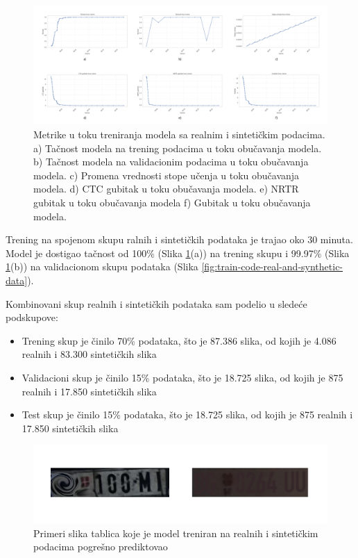 \documentclass[a4paper,12pt]{article}
\begin{document}
	\begin{figure}[H]
		\centering
		\includegraphics[width=\textwidth]{assets/real-and-synthetic-data-metrics.png}
		\caption{Metrike u toku treniranja modela sa realnim i sintetičkim podacima. a) Tačnost modela na trening podacima u toku obučavanja modela. b) Tačnost modela na validacionim podacima u toku obučavanja modela. c) Promena vrednosti stope učenja u toku obučavanja modela. d) CTC gubitak u toku obučavanja modela. e) NRTR gubitak u toku obučavanja modela f) Gubitak u toku obučavanja modela.}
		\label{fig:real-and-synthetic-data-metrics}
	\end{figure}
	
	Trening na spojenom skupu ralnih i sintetičkih podataka je trajao oko 30 minuta. Model je dostigao tačnost od 100\% (Slika \ref{fig:real-and-synthetic-data-metrics}(a)) na trening skupu i 99.97\% (Slika \ref{fig:real-and-synthetic-data-metrics}(b)) na validacionom skupu podataka (Slika \ref{fig:train-code-real-and-synthetic-data}).\newline
	
	Kombinovani skup realnih i sintetičkih podataka sam podelio u sledeće podskupove:
	\begin{itemize}
		\item Trening skup je činilo 70\% podataka, što je 87.386 slika, od kojih je 4.086 realnih i 83.300 sintetičkih slika
		\item Validacioni skup je činilo 15\% podataka, što je 18.725 slika, od kojih je 875 realnih i 17.850 sintetičkih slika
		\item Test skup je činilo 15\% podataka, što je 18.725 slika, od kojih je 875 realnih i 17.850 sintetičkih slika
	\end{itemize}
	
	\begin{figure}[H]
		\centering
		\includegraphics[width=\textwidth]{assets/bad-predictions-real-and-synthetic-data-model.png}
		\caption{Primeri slika tablica koje je model treniran na realnih i sintetičkim podacima pogrešno prediktovao}
		\label{fig:bad-predictions-real-and-synthetic-data-model}
	\end{figure}
	
\end{document}

